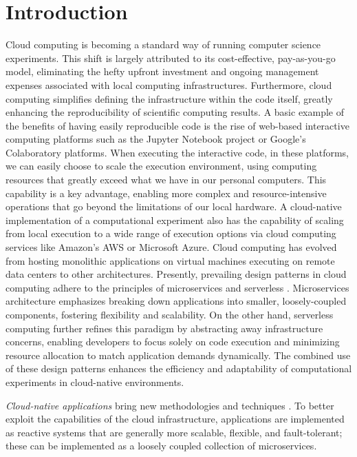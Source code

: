 \documentclass{cys}
\begin{document}
\section{Introduction}
\label{sec:introduction}

Cloud computing is becoming a standard way of running computer science experiments.  
This shift is largely attributed to its cost-effective, pay-as-you-go model, 
eliminating the hefty upfront investment and ongoing management expenses associated 
with local computing infrastructures. Furthermore, cloud computing simplifies defining
the infrastructure within the code itself, greatly enhancing the reproducibility 
of scientific computing results. A basic example of the benefits of having easily reproducible code is the rise of web-based 
interactive computing platforms such as the Jupyter Notebook project \cite{kluyver2016jupyter} 
or Google's Colaboratory \cite{carneiro2018performance} platforms.
When executing the interactive code, in these platforms, we can easily choose to scale the 
execution environment, using computing resources that greatly exceed what we have in 
our personal computers. This capability is a key advantage, enabling more complex and 
resource-intensive operations that go beyond the limitations of our local hardware.
A cloud-native implementation of a computational experiment also
has the capability of scaling from local execution to a wide range of execution options 
via cloud computing services like Amazon's AWS or Microsoft Azure. 
Cloud computing has evolved from hosting monolithic applications on virtual 
machines executing on remote data centers to other architectures. 
Presently, prevailing design patterns in cloud computing adhere to the principles of  
microservices \cite{microservices} and serverless \cite{varghese2018next}.
Microservices architecture \cite{malawski2017serverless} emphasizes breaking down
applications into smaller, loosely-coupled components, fostering flexibility and 
scalability. On the other hand, serverless computing further refines this paradigm by abstracting away 
infrastructure concerns, enabling developers to focus solely on code execution and 
minimizing resource allocation to match application demands dynamically. 
The combined use of these design patterns enhances the efficiency and adaptability of
computational experiments in cloud-native environments.

{\em Cloud-native applications} bring new methodologies and
techniques \cite{Baldini2016287} %
. To better exploit the capabilities of the cloud
infrastructure, applications are implemented as reactive systems \cite{boner2014reactive}
that are generally more scalable, flexible, and fault-tolerant; these can be
implemented as a loosely coupled collection of microservices.
\end{document}
